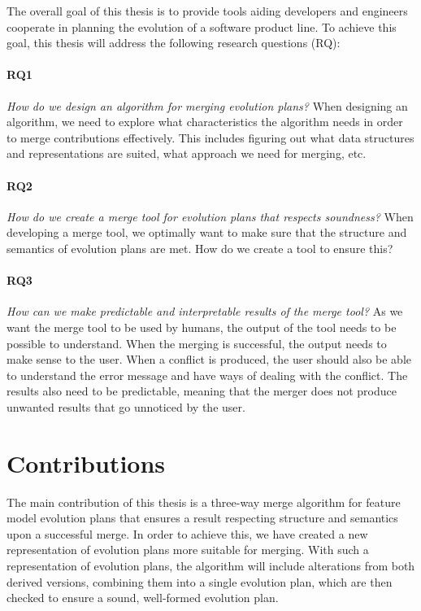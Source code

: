 \documentclass[a4paper,english]{ifimaster}
\begin{document}
The overall goal of this thesis is to provide tools aiding developers and engineers cooperate in planning the evolution of a software product line. To achieve this goal, this thesis will address the following research questions (RQ):

\paragraph{RQ1}

\textit{How do we design an algorithm for merging evolution plans?} When designing an algorithm, we need to explore what characteristics the algorithm needs in order to merge contributions effectively. This includes figuring out what data structures and representations are suited, what approach we need for merging, etc.

\paragraph{RQ2}

\textit{How do we create a merge tool for evolution plans that respects soundness?} When developing a merge tool, we optimally want to make sure that the structure and semantics of evolution plans are met. How do we create a tool to ensure this?

\paragraph{RQ3}

\textit{How can we make predictable and interpretable results of the merge tool?} As we want the merge tool to be used by humans, the output of the tool needs to be possible to understand. When the merging is successful, the output needs to make sense to the user. When a conflict is produced, the user should also be able to understand the error message and have ways of dealing with the conflict. The results also need to be predictable, meaning that the merger does not produce unwanted results that go unnoticed by the user.

\section{Contributions}%
\label{sec:contributions}

The main contribution of this thesis is a three-way merge algorithm for feature model evolution plans that ensures a result respecting structure and semantics upon a successful merge. In order to achieve this, we have created a new representation of evolution plans more suitable for merging. With such a representation of evolution plans, the algorithm will include alterations from both derived versions, combining them into a single evolution plan, which are then checked to ensure a sound, well-formed evolution plan.
\end{document}
